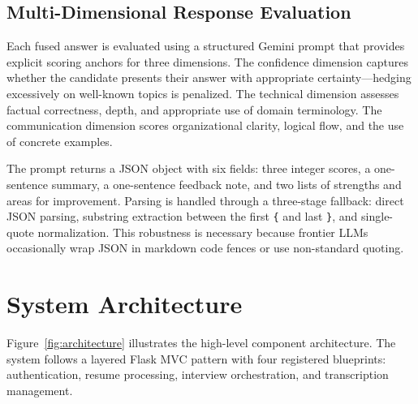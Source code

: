 \documentclass[conference]{IEEEtran}
\begin{document}
\subsection{Multi-Dimensional Response Evaluation}

Each fused answer is evaluated using a structured Gemini prompt that provides explicit scoring anchors for three dimensions. The confidence dimension captures whether the candidate presents their answer with appropriate certainty—hedging excessively on well-known topics is penalized. The technical dimension assesses factual correctness, depth, and appropriate use of domain terminology. The communication dimension scores organizational clarity, logical flow, and the use of concrete examples.

The prompt returns a JSON object with six fields: three integer scores, a one-sentence summary, a one-sentence feedback note, and two lists of strengths and areas for improvement. Parsing is handled through a three-stage fallback: direct JSON parsing, substring extraction between the first \texttt{\{} and last \texttt{\}}, and single-quote normalization. This robustness is necessary because frontier LLMs occasionally wrap JSON in markdown code fences or use non-standard quoting.

\section{System Architecture}
\label{sec:architecture}

Figure~\ref{fig:architecture} illustrates the high-level component architecture. The system follows a layered Flask MVC pattern with four registered blueprints: authentication, resume processing, interview orchestration, and transcription management.
\end{document}

